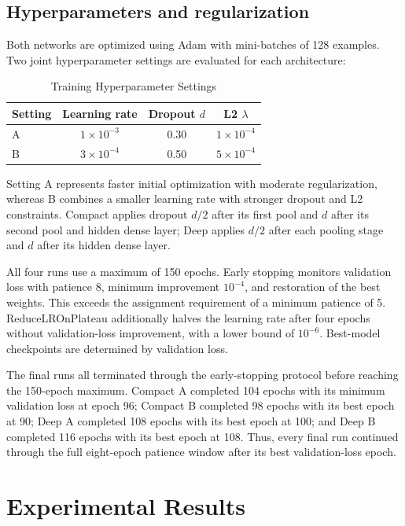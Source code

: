 \documentclass[conference]{IEEEtran}
\begin{document}
\subsection{Hyperparameters and regularization}

Both networks are optimized using Adam with mini-batches of 128 examples. Two joint hyperparameter settings are evaluated for each architecture:

\begin{table}[!t]
\caption{Training Hyperparameter Settings}
\label{tab:hyperparams}
\centering
\footnotesize
\begin{tabular}{@{}lccc@{}}
\toprule
Setting & Learning rate & Dropout $d$ & L2 $\lambda$ \\
\midrule
A & $1\times10^{-3}$ & 0.30 & $1\times10^{-4}$ \\
B & $3\times10^{-4}$ & 0.50 & $5\times10^{-4}$ \\
\bottomrule
\end{tabular}
\end{table}

Setting A represents faster initial optimization with moderate regularization, whereas B combines a smaller learning rate with stronger dropout and L2 constraints. Compact applies dropout $d/2$ after its first pool and $d$ after its second pool and hidden dense layer; Deep applies $d/2$ after each pooling stage and $d$ after its hidden dense layer.

All four runs use a maximum of 150 epochs. Early stopping monitors validation loss with patience 8, minimum improvement $10^{-4}$, and restoration of the best weights. This exceeds the assignment requirement of a minimum patience of 5. ReduceLROnPlateau additionally halves the learning rate after four epochs without validation-loss improvement, with a lower bound of $10^{-6}$. Best-model checkpoints are determined by validation loss.

The final runs all terminated through the early-stopping protocol before reaching the 150-epoch maximum. Compact A completed 104 epochs with its minimum validation loss at epoch 96; Compact B completed 98 epochs with its best epoch at 90; Deep A completed 108 epochs with its best epoch at 100; and Deep B completed 116 epochs with its best epoch at 108. Thus, every final run continued through the full eight-epoch patience window after its best validation-loss epoch.


\section{Experimental Results}
\end{document}

